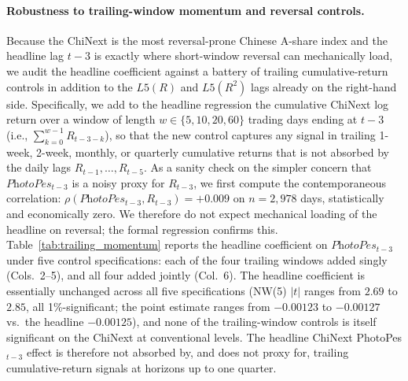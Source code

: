 \documentclass[AER]{AEA}
\begin{document}
\paragraph{Robustness to trailing-window momentum and reversal controls.} Because the ChiNext is the most reversal-prone Chinese A-share index and the headline lag $t-3$ is exactly where short-window reversal can mechanically load, we audit the headline coefficient against a battery of trailing cumulative-return controls in addition to the $L5(R)$ and $L5(R^2)$ lags already on the right-hand side. Specifically, we add to the headline regression the cumulative ChiNext log return over a window of length $w \in \{5, 10, 20, 60\}$ trading days ending at $t-3$ (i.e., $\sum_{k=0}^{w-1} R_{t-3-k}$), so that the new control captures any signal in trailing 1-week, 2-week, monthly, or quarterly cumulative returns that is not absorbed by the daily lags $R_{t-1},\ldots,R_{t-5}$. As a sanity check on the simpler concern that $\textit{PhotoPes}_{t-3}$ is a noisy proxy for $R_{t-3}$, we first compute the contemporaneous correlation: $\rho(\textit{PhotoPes}_{t-3}, R_{t-3}) = +0.009$ on $n=2{,}978$ days, statistically and economically zero. We therefore do not expect mechanical loading of the headline on reversal; the formal regression confirms this. Table~\ref{tab:trailing_momentum} reports the headline coefficient on $\textit{PhotoPes}_{t-3}$ under five control specifications: each of the four trailing windows added singly (Cols.~2--5), and all four added jointly (Col.~6). The headline coefficient is essentially unchanged across all five specifications (NW(5) $|t|$ ranges from $2.69$ to $2.85$, all 1\%-significant; the point estimate ranges from $-0.00123$ to $-0.00127$ vs.\ the headline $-0.00125$), and none of the trailing-window controls is itself significant on the ChiNext at conventional levels. The headline ChiNext PhotoPes$_{t-3}$ effect is therefore not absorbed by, and does not proxy for, trailing cumulative-return signals at horizons up to one quarter.
\end{document}

